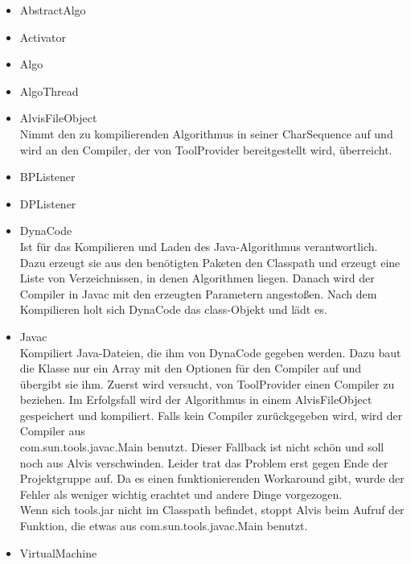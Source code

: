 \documentclass[10pt,a4paper,oneside]{scrbook}
\begin{document}
\begin{itemize}
 \item AbstractAlgo\\
 \item Activator\\
 \item Algo\\
 \item AlgoThread\\
 \item AlvisFileObject\\
    Nimmt den zu kompilierenden Algorithmus in seiner CharSequence auf und wird an den Compiler, der von ToolProvider
    bereitgestellt wird, überreicht.
 \item BPListener\\
 \item DPListener\\
 \item DynaCode\\
    Ist für das Kompilieren und Laden des Java-Algorithmus verantwortlich.
    Dazu erzeugt sie aus den benötigten Paketen den Classpath und erzeugt eine Liste von Verzeichnissen, in denen
    Algorithmen liegen. Danach wird der Compiler in Javac mit den erzeugten Parametern angestoßen. Nach dem Kompilieren
    holt sich DynaCode das class-Objekt und lädt es.
 \item Javac\\
    Kompiliert Java-Dateien, die ihm von DynaCode gegeben werden. Dazu baut die Klasse nur ein Array mit den
    Optionen für den Compiler auf und übergibt sie ihm. Zuerst wird versucht, von ToolProvider einen Compiler zu
    beziehen. Im Erfolgsfall wird der Algorithmus in einem AlvisFileObject gespeichert und kompiliert.
    Falls kein Compiler zurückgegeben wird, wird der Compiler aus\\com.\-sun.\-tools.\-javac.\-Main benutzt.
    Dieser Fallback ist nicht schön und soll noch aus Alvis verschwinden. Leider trat das Problem erst gegen Ende der
    Projektgruppe auf. Da es einen funktionierenden Workaround gibt, wurde der Fehler als weniger wichtig erachtet und
    andere Dinge vorgezogen.\\
    Wenn sich tools.jar nicht im Classpath befindet, stoppt Alvis beim Aufruf der Funktion, die etwas
    aus com.\-sun.\-tools.\-javac.\-Main benutzt.
 \item VirtualMachine \\
\end{itemize}
\end{document}
